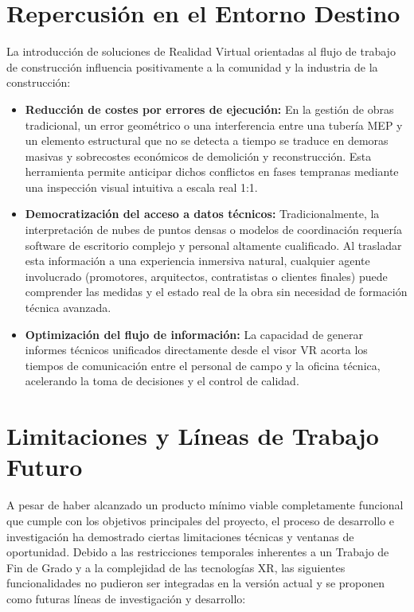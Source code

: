 \section{Repercusión en el Entorno Destino}
La introducción de soluciones de Realidad Virtual orientadas al flujo de trabajo de construcción influencia positivamente a la comunidad y la industria de la construcción:
\begin{itemize}
    \item \textbf{Reducción de costes por errores de ejecución:} En la gestión de obras tradicional, un error geométrico o una interferencia entre una tubería MEP y un elemento estructural que no se detecta a tiempo se traduce en demoras masivas y sobrecostes económicos de demolición y reconstrucción. Esta herramienta permite anticipar dichos conflictos en fases tempranas mediante una inspección visual intuitiva a escala real 1:1.
    \item \textbf{Democratización del acceso a datos técnicos:} Tradicionalmente, la interpretación de nubes de puntos densas o modelos de coordinación requería software de escritorio complejo y personal altamente cualificado. Al trasladar esta información a una experiencia inmersiva natural, cualquier agente involucrado (promotores, arquitectos, contratistas o clientes finales) puede comprender las medidas y el estado real de la obra sin necesidad de formación técnica avanzada.
    \item \textbf{Optimización del flujo de información:} La capacidad de generar informes técnicos unificados directamente desde el visor VR acorta los tiempos de comunicación entre el personal de campo y la oficina técnica, acelerando la toma de decisiones y el control de calidad.
\end{itemize}

\section{Limitaciones y Líneas de Trabajo Futuro}
A pesar de haber alcanzado un producto mínimo viable completamente funcional que cumple con los objetivos principales del proyecto, el proceso de desarrollo e investigación ha demostrado ciertas limitaciones técnicas y ventanas de oportunidad. Debido a las restricciones temporales inherentes a un Trabajo de Fin de Grado y a la complejidad de las tecnologías XR, las siguientes funcionalidades no pudieron ser integradas en la versión actual y se proponen como futuras líneas de investigación y desarrollo:

